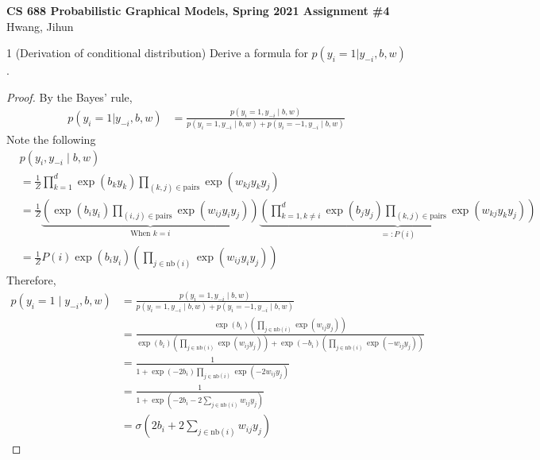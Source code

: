 \documentclass[12pt]{article}
\begin{document}
\noindent \textbf{CS 688 Probabilistic Graphical Models, Spring 2021 \hfill Assignment \#4}\\
\; \hfill Hwang, Jihun

\hrulefill

\begin{problem}{1 (Derivation of conditional distribution)}
Derive a formula for $p(y_i=1|y_{-i}, b, w)$.
\end{problem}

\newcommand{\nb}[1]{\mathrm{nb}(#1)}
\newcommand{\pairs}{\mathrm{pairs}}

\begin{proof}
By the Bayes' rule,
\begin{align*}
    p(y_i=1|y_{-i}, b, w)
    & = \frac{p(y_i=1, y_{-i} \mid  b, w)}{p(y_i=1, y_{-i} \mid  b, w) + p(y_i=-1, y_{-i} \mid  b, w)}
\end{align*}
Note the following
\begin{align*}
    & p(y_i, y_{-i} \mid  b, w) \\
    & = \frac{1}{Z} \prod_{k=1}^d \exp(b_k y_k) \prod_{(k,j) \in \pairs} \exp(w_{kj} y_k y_j) \\
    & = \frac{1}{Z} \underbrace{\left(\exp(b_i y_i) \prod_{(i, j) \in \pairs} \exp(w_{ij} y_i y_j) \right)}_{\text{When } k = i} \underbrace{\left( \prod_{k=1, k\neq i}^d \exp(b_j y_j) \prod_{(k,j) \in \pairs} \exp(w_{kj} y_k y_j) \right)}_{=: P(i)} \\
    & = \frac{1}{Z} P(i) \exp(b_i y_i) \left(\prod_{j \in \nb{i}} \exp(w_{ij} y_i y_j)\right) 
\end{align*}
Therefore,
\begin{align*}
    p(y_i=1 \mid y_{-i}, b, w)
    & = \frac{p(y_i=1, y_{-i} \mid  b, w)}{p(y_i=1, y_{-i} \mid  b, w) + p(y_i=-1, y_{-i} \mid  b, w)} \\
    & = \frac{\exp(b_i) \left(\prod_{j \in \nb{i}} \exp(w_{ij} y_j)\right)}{\exp(b_i ) \left(\prod_{j \in \nb{i}} \exp(w_{ij} y_j)\right) + \exp(-b_i) \left(\prod_{j \in \nb{i}} \exp(-w_{ij} y_j)\right)} \\
    & = \frac{1}{1+\exp(-2b_i) \prod_{j \in \nb{i}} \exp(-2 w_{ij} y_j)} \\
    & = \frac{1}{1+\exp\left(-2b_i - 2 \sum_{j \in \nb{i}} w_{ij} y_j \right)} \\
    & = \boxed{\sigma\left( 2b_i + 2 \sum_{j \in \nb{i}} w_{ij} y_j \right)}
\end{align*}
\end{proof}

\newpage
\end{document}
